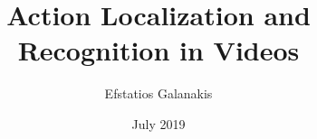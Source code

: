 \documentclass[diploma]{softlab-thesis}
\begin{document}

\frontmatter

\title{Action Localization and Recognition in Videos}
\author{Efstatios Galanakis}
\date{July 2019}

\supervisor{}
\supervisorpos{}

\committeeone{}
\committeeonepos{}
\committeetwo{}
\committeetwopos{}
\committeethree{}
\committeethreepos{}

\department{}

\maketitle


\end{document}
